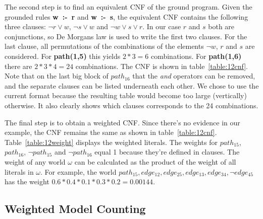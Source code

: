 

The second step is to find an equivalent CNF of the ground program. Given the grounded rules \mbox{\textbf{w :- r}} and \mbox{\textbf{w :- s}}, the equivalent CNF contains the following three clauses: $\neg r \lor w$, $\neg s \lor w$ and $\neg w \lor s \lor r$. In our case $r$ and $s$ both are conjunctions, so De Morgans law is used to write the first two clauses. For the last clause, all permutations of the combinations of the elements $\neg w$, $r$ and $s$ are considered. For \textbf{path(1,5)} this yields $2*3 = 6$ combinations. For \textbf{path(1,6)} there are $2*3*4 = 24$ combinations. The CNF is shown in table~\ref{table:12cnf}. Note that on the last big block of $path_{16}$ that the \textit{and} operators can be removed, and the separate clauses can be listed underneath each other. We chose to use the current format because the resulting table would become too large (vertically) otherwise. It also clearly shows which clauses corresponds to the 24 combinations.



The final step is to obtain a weighted CNF. Since there's no evidence in our example, the CNF remains the same as shown in table~\ref{table:12cnf}. Table~\ref{table:12weight} displays the weighted literals. The weights for $path_{15}$, $path_{16}$, $\neg path_{15}$ and $\neg path_{16}$ equal 1 because they're defined in clauses. The weight of any world $\omega$ can be calculated as the product of the weight of all literals in $\omega$. For example, the world ${path_{15}, edge_{12}, edge_{25}, edge_{13}, edge_{34}, \neg edge_{45}}$ has the weight $0.6*0.4*0.1*0.3*0.2 = 0.00144$.




\subsection{Weighted Model Counting}


